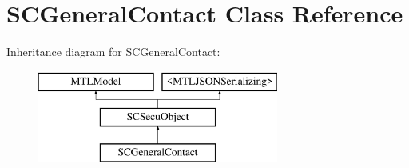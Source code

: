 \hypertarget{interface_s_c_general_contact}{}\section{S\+C\+General\+Contact Class Reference}
\label{interface_s_c_general_contact}
Inheritance diagram for S\+C\+General\+Contact\+:\begin{figure}[H]
\begin{center}
\leavevmode
\includegraphics[height=3.000000cm]{interface_s_c_general_contact}
\end{center}
\end{figure}
